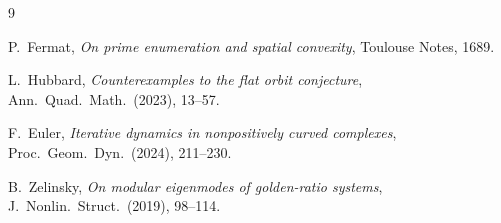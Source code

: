 \documentclass{amsart}
\begin{document}
\begin{thebibliography}{9}

P.~Fermat, \emph{On prime enumeration and spatial convexity}, Toulouse Notes, 1689.

L.~Hubbard, \emph{Counterexamples to the flat orbit conjecture}, 
Ann.\ Quad.\ Math.\ (2023), 13--57.

F.~Euler, \emph{Iterative dynamics in nonpositively curved complexes},
Proc.\ Geom.\ Dyn.\ (2024), 211--230.

B.~Zelinsky, \emph{On modular eigenmodes of golden-ratio systems},
J.\ Nonlin.\ Struct.\ (2019), 98--114.

\end{thebibliography}
\end{document}
